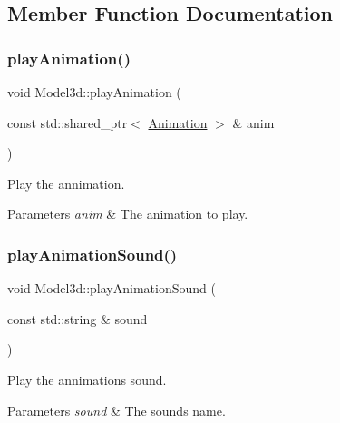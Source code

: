 \subsection{Member Function Documentation}
\mbox{\label{classModel3d_a108ab9c13b7ae24cc1711c2e97fbc625}} 
\subsubsection{\texorpdfstring{play\+Animation()}{playAnimation()}}
{\footnotesize\ttfamily void Model3d\+::play\+Animation (\begin{DoxyParamCaption}\item[{const std\+::shared\+\_\+ptr$<$ \hyperlink{structModel3d_1_1Animation}{Animation} $>$ \&}]{anim }\end{DoxyParamCaption})}



Play the annimation. 


\begin{DoxyParams}{Parameters}
{\em anim} & The animation to play. \\
\hline
\end{DoxyParams}
\mbox{\label{classModel3d_a6ce79286c43bd4a6852c544bdad8ee18}} 
\subsubsection{\texorpdfstring{play\+Animation\+Sound()}{playAnimationSound()}}
{\footnotesize\ttfamily void Model3d\+::play\+Animation\+Sound (\begin{DoxyParamCaption}\item[{const std\+::string \&}]{sound }\end{DoxyParamCaption})}



Play the annimation\textquotesingle{}s sound. 


\begin{DoxyParams}{Parameters}
{\em sound} & The sound\textquotesingle{}s name. \\
\hline
\end{DoxyParams}
\mbox{\label{classModel3d_a29eeaa6769b0c21268f4704ac2d404b7}} 
